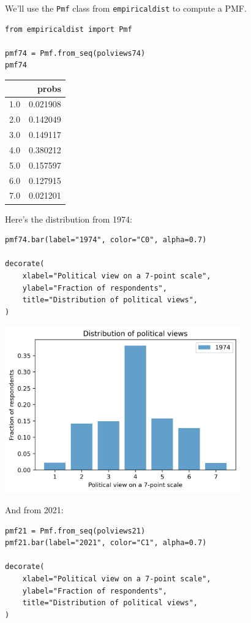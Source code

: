 We'll use the \passthrough{\lstinline!Pmf!} class from
\passthrough{\lstinline!empiricaldist!} to compute a PMF.

\begin{lstlisting}[]
from empiricaldist import Pmf

pmf74 = Pmf.from_seq(polviews74)
pmf74
\end{lstlisting}

\begin{tabular}{lr}
\midrule
{} &     probs \\
\midrule
1.0 &  0.021908 \\
2.0 &  0.142049 \\
3.0 &  0.149117 \\
4.0 &  0.380212 \\
5.0 &  0.157597 \\
6.0 &  0.127915 \\
7.0 &  0.021201 \\
\midrule
\end{tabular}

Here's the distribution from 1974:

\begin{lstlisting}[]
pmf74.bar(label="1974", color="C0", alpha=0.7)

decorate(
    xlabel="Political view on a 7-point scale",
    ylabel="Fraction of respondents",
    title="Distribution of political views",
)
\end{lstlisting}

\begin{center}
\includegraphics[width=4in]{chapters/02_polviews_files/02_polviews_32_0.png}
\end{center}

And from 2021:

\begin{lstlisting}[]
pmf21 = Pmf.from_seq(polviews21)
pmf21.bar(label="2021", color="C1", alpha=0.7)

decorate(
    xlabel="Political view on a 7-point scale",
    ylabel="Fraction of respondents",
    title="Distribution of political views",
)
\end{lstlisting}

